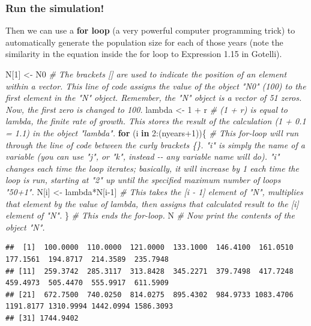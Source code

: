 \documentclass[
]{article}
\newenvironment{Shaded}{\begin{snugshade}}{\end{snugshade}}
\newcommand{\CommentTok}[1]{\textcolor[rgb]{0.56,0.35,0.01}{\textit{#1}}}
\newcommand{\ControlFlowTok}[1]{\textcolor[rgb]{0.13,0.29,0.53}{\textbf{#1}}}
\newcommand{\DecValTok}[1]{\textcolor[rgb]{0.00,0.00,0.81}{#1}}
\newcommand{\NormalTok}[1]{#1}
\newcommand{\OtherTok}[1]{\textcolor[rgb]{0.56,0.35,0.01}{#1}}
\newcommand{\SpecialCharTok}[1]{\textcolor[rgb]{0.00,0.00,0.00}{#1}}
\begin{document}
\hypertarget{run-the-simulation}{%
\subsubsection{Run the simulation!}\label{run-the-simulation}}

Then we can use a \textbf{for loop} (a very powerful computer
programming trick) to automatically generate the population size for
each of those years (note the similarity in the equation inside the for
loop to Expression 1.15 in Gotelli).

\begin{Shaded}
\begin{Highlighting}[]
\NormalTok{N[}\DecValTok{1}\NormalTok{] }\OtherTok{\textless{}{-}}\NormalTok{ N0                }\CommentTok{\# The brackets [] are used to indicate the position of an element within a vector. This line of code assigns the value of the object "N0" (100) to the first element in the "N" object. Remember, the "N" object is a vector of 51 zeros. Now, the first zero is changed to 100.}
\NormalTok{lambda }\OtherTok{\textless{}{-}} \DecValTok{1} \SpecialCharTok{+}\NormalTok{ r           }\CommentTok{\# (1 + r) is equal to lambda, the finite rate of growth.  This stores the result of the calculation (1 + 0.1 = 1.1) in the object "lambda".}
\ControlFlowTok{for}\NormalTok{ (i }\ControlFlowTok{in} \DecValTok{2}\SpecialCharTok{:}\NormalTok{(nyears}\SpecialCharTok{+}\DecValTok{1}\NormalTok{))\{  }\CommentTok{\# This for{-}loop will run through the line of code between the curly brackets \{\}. "i" is simply the name of a variable (you can use "j", or "k", instead {-}{-} any variable name will do). "i" changes each time the loop iterates; basically, it will increase by 1 each time the loop is run, starting at "2" up until the specified maximum number of loops "50+1". }
\NormalTok{  N[i] }\OtherTok{\textless{}{-}}\NormalTok{ lambda}\SpecialCharTok{*}\NormalTok{N[i}\DecValTok{{-}1}\NormalTok{]   }\CommentTok{\# This takes the [i {-} 1] element of "N", multiplies that element by the value of lambda, then assigns that calculated result to the [i] element of "N".}
\NormalTok{\}                         }\CommentTok{\# This ends the for{-}loop.}
\NormalTok{N                         }\CommentTok{\# Now print the contents of the object "N".}
\end{Highlighting}
\end{Shaded}

\begin{verbatim}
##  [1]  100.0000  110.0000  121.0000  133.1000  146.4100  161.0510  177.1561  194.8717  214.3589  235.7948
## [11]  259.3742  285.3117  313.8428  345.2271  379.7498  417.7248  459.4973  505.4470  555.9917  611.5909
## [21]  672.7500  740.0250  814.0275  895.4302  984.9733 1083.4706 1191.8177 1310.9994 1442.0994 1586.3093
## [31] 1744.9402
\end{verbatim}
\end{document}
